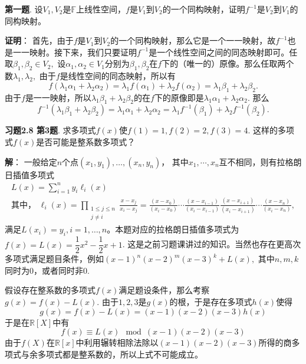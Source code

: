 \newpageorvspace


{\bf 第一题}. 设$V_1, V_2$是$\mathbb{F}$上线性空间，$f$是$V_1$到$V_2$的一个同构映射，证明$f^{-1}$是$V_2$到$V_1$的同构映射。

\newpageorvspace

{\bf 证明}： 首先，由于$f$是$V_1$到$V_2$的一个同构映射，那么它是一个一一映射，故$f^{-1}$也是一一映射。接下来，我们只要证明$f^{-1}$是一个线性空间之间的同态映射即可。任取$\beta_1, \beta_2 \in V_2,$ 设$\alpha_1, \alpha_2 \in V_1$分别为$\beta_1, \beta_2$在$f$下的（唯一的）原像。那么任取两个数$\lambda_1, \lambda_2,$ 由于$f$是线性空间的同态映射，所以有
$$f(\lambda_1 \alpha_1 + \lambda_2 \alpha_2) = \lambda_1 f(\alpha_1) + \lambda_2 f(\alpha_2) = \lambda_1 \beta_1 + \lambda_2 \beta_2.$$
由于$f$是一一映射，所以$\lambda_1 \beta_1 + \lambda_2 \beta_2$的在$f$下的原像即是$\lambda_1 \alpha_1 + \lambda_2 \alpha_2.$ 那么
$$f^{-1}(\lambda_1 \beta_1 + \lambda_2 \beta_2) = \lambda_1 \alpha_1 + \lambda_2 \alpha_2 = \lambda_1 f^{-1}(\beta_1) + \lambda_2 f^{-1}(\beta_2).$$

\newpageorvspace

{\bf 习题2.8 第3题}. 求多项式$f(x)$使$f(1) = 1, f(2) = 2, f(3) = 4.$ 这样的多项式$f(x)$是否可能是整系数多项式？

\newpageorvspace

{\bf 解}： 一般给定$n$个点$(x_1,y_1), \dots, (x_n,y_n)$， 其中$x_1, \cdots, x_n$互不相同，则有拉格朗日插值多项式
\begin{gather*}
L(x) = \sum_{i=1}^{n}y_{i}\ell_{i}(x) \\
\text{其中， } \ell_{i}(x) = \prod_{\begin{smallmatrix}1\leq j \leq n \\ j\neq i\end{smallmatrix}}{\frac {x-x_{j}}{x_{i}-x_{j}}}={\frac {(x-x_{0})}{(x_{i}-x_{0})}}\cdots {\frac {(x-x_{i-1})}{(x_{i}-x_{i-1})}}{\frac {(x-x_{i+1})}{(x_{i}-x_{i+1})}}\cdots {\frac {(x-x_{n})}{(x_{i}-x_{n})}},
\end{gather*}
满足$L(x_i) = y_i, i=1, \dots ,n$。本题对应的拉格朗日插值多项式为$f(x) = L(x) = \dfrac{1}{2}x^2 - \dfrac{1}{2}x + 1$. 这是之前习题课讲过的知识。当然也存在更高次多项式满足题目条件，例如$(x-1)^n(x-2)^m(x-3)^k + L(x),$ 其中$n, m, k$同时为0，或者同时非0.

假设存在整系数的多项式$f(x)$满足题设条件，那么考察$g(x) = f(x) - L(x).$ 由于$1, 2, 3$是$g(x)$的根，于是存在多项式$h(x)$使得
$$g(x) = f(x) - L(x) = (x-1)(x-2)(x-3) h(x)$$
于是在$\mathbb{R}[X]$中有
$$f(x) \equiv L(x) \mod (x-1)(x-2)(x-3)$$
由于$f(X)$在$\mathbb{R}[x]$中利用辗转相除法除以$(x-1)(x-2)(x-3)$所得的商多项式与余多项式都是整系数的，所以上式不可能成立。


